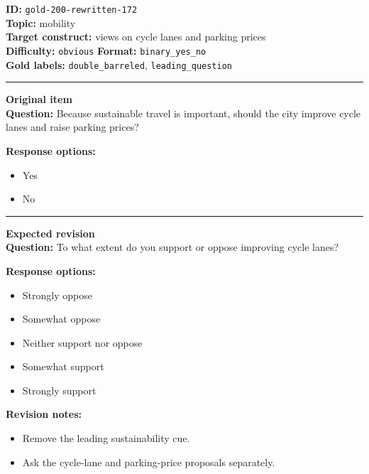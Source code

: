 \documentclass[10pt,a4paper]{article}
\newcommand{\sectionline}{\vspace{0.15em}\hrule\vspace{0.35em}}
\begin{document}
\begin{tcolorbox}[colframe=FlawRed,colback=white,colbacktitle=FlawRed!9,coltitle=black,title={Item 172\hfill Flawed item}]
\textbf{ID:} \texttt{gold-200-rewritten-172}\\
\textbf{Topic:} mobility\\
\textbf{Target construct:} views on cycle lanes and parking prices\\
\textbf{Difficulty:} \texttt{obvious} \quad \textbf{Format:} \texttt{binary\_yes\_no}\\
\textbf{Gold labels:} \texttt{double\_barreled}, \texttt{leading\_question}\\
\sectionline
\textbf{Original item}\\
\textbf{Question:} Because sustainable travel is important, should the city improve cycle lanes and raise parking prices?
\par\textbf{Response options:}
\begin{itemize}
\item Yes
\item No
\end{itemize}
\sectionline
\textbf{Expected revision}\\
\textbf{Question:} To what extent do you support or oppose improving cycle lanes?
\par\textbf{Response options:}
\begin{itemize}
\item Strongly oppose
\item Somewhat oppose
\item Neither support nor oppose
\item Somewhat support
\item Strongly support
\end{itemize}
\par\textbf{Revision notes:}
\begin{itemize}
\item Remove the leading sustainability cue.
\item Ask the cycle-lane and parking-price proposals separately.
\end{itemize}
\end{tcolorbox}
\end{document}
